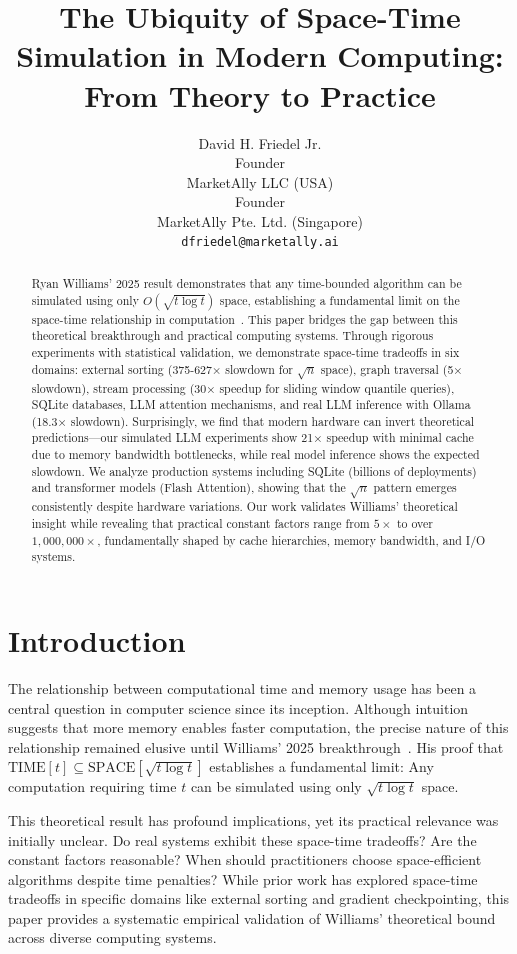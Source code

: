 \documentclass[11pt]{article}
\title{The Ubiquity of Space-Time Simulation in Modern Computing: From Theory to Practice}
\author{
David H. Friedel Jr.\\
Founder \\ MarketAlly LLC (USA) \\ Founder \\ MarketAlly Pte. Ltd. (Singapore) \\ 
\texttt{dfriedel@marketally.ai}
}
\date{}
\theoremstyle{definition}
\begin{document}
\maketitle

\begin{abstract}
Ryan Williams' 2025 result demonstrates that any time-bounded algorithm can be simulated using only $O(\sqrt{t \log t})$ space, establishing a fundamental limit on the space-time relationship in computation~\cite{williams2025}. This paper bridges the gap between this theoretical breakthrough and practical computing systems. Through rigorous experiments with statistical validation, we demonstrate space-time tradeoffs in six domains: external sorting (375-627× slowdown for $\sqrt{n}$ space), graph traversal (5× slowdown), stream processing (30× speedup for sliding window quantile queries), SQLite databases, LLM attention mechanisms, and real LLM inference with Ollama (18.3× slowdown). Surprisingly, we find that modern hardware can invert theoretical predictions—our simulated LLM experiments show 21× speedup with minimal cache due to memory bandwidth bottlenecks, while real model inference shows the expected slowdown. We analyze production systems including SQLite (billions of deployments) and transformer models (Flash Attention), showing that the $\sqrt{n}$ pattern emerges consistently despite hardware variations. Our work validates Williams' theoretical insight while revealing that practical constant factors range from $5\times$ to over $1{,}000{,}000\times$, fundamentally shaped by cache hierarchies, memory bandwidth, and I/O systems.
\end{abstract}

\section{Introduction}

The relationship between computational time and memory usage has been a central question in computer science since its inception. Although intuition suggests that more memory enables faster computation, the precise nature of this relationship remained elusive until Williams' 2025 breakthrough~\cite{williams2025}. His proof that $\text{TIME}[t] \subseteq \text{SPACE}[\sqrt{t \log t}]$ establishes a fundamental limit: Any computation requiring time $t$ can be simulated using only $\sqrt{t \log t}$ space.

This theoretical result has profound implications, yet its practical relevance was initially unclear. Do real systems exhibit these space-time tradeoffs? Are the constant factors reasonable? When should practitioners choose space-efficient algorithms despite time penalties? While prior work has explored space-time tradeoffs in specific domains like external sorting and gradient checkpointing, this paper provides a systematic empirical validation of Williams' theoretical bound across diverse computing systems.
\end{document}
